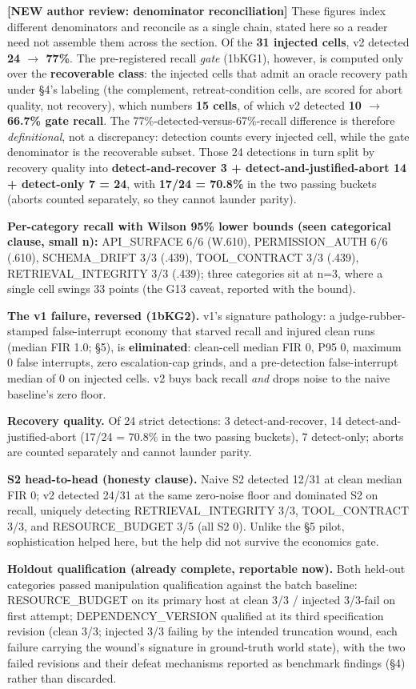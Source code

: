 \documentclass[acmsmall,screen,review,anonymous]{acmart}
\renewenvironment{leftbar}{%
  \def\FrameCommand{\hspace{2pt}{\color{lbcol}\vrule width 1.5pt}\hspace{8pt}}%
  \MakeFramed{\advance\hsize-\width \FrameRestore}\small}%
  {\endMakeFramed}
\begin{document}
\begin{leftbar}
\textbf{[NEW \textperiodcentered{} author review: denominator reconciliation]} These figures index different denominators and reconcile as a single chain, stated here so a reader need not assemble them across the section. Of the \textbf{31 injected cells}, v2 detected \textbf{24 $\rightarrow$ 77\%}. The pre-registered recall \emph{gate} (1bKG1), however, is computed only over the \textbf{recoverable class}: the injected cells that admit an oracle recovery path under \S4's labeling (the complement, retreat-condition cells, are scored for abort quality, not recovery), which numbers \textbf{15 cells}, of which v2 detected \textbf{10 $\rightarrow$ 66.7\% gate recall}. The 77\%-detected-versus-67\%-recall difference is therefore \emph{definitional}, not a discrepancy: detection counts every injected cell, while the gate denominator is the recoverable subset. Those 24 detections in turn split by recovery quality into \textbf{detect-and-recover 3 + detect-and-justified-abort 14 + detect-only 7 = 24}, with \textbf{17/24 = 70.8\%} in the two passing buckets (aborts counted separately, so they cannot launder parity).

\textbf{Per-category recall with Wilson 95\% lower bounds (seen categorical clause, small n):} API\_SURFACE 6/6 (W.610), PERMISSION\_AUTH 6/6 (.610), SCHEMA\_DRIFT 3/3 (.439), TOOL\_CONTRACT 3/3 (.439), RETRIEVAL\_INTEGRITY 3/3 (.439); three categories sit at n=3, where a single cell swings 33 points (the G13 caveat, reported with the bound).

\textbf{The v1 failure, reversed (1bKG2).} v1's signature pathology: a judge-rubber-stamped false-interrupt economy that starved recall and injured clean runs (median FIR 1.0; \S5), is \textbf{eliminated}: clean-cell median FIR 0, P95 0, maximum 0 false interrupts, zero escalation-cap grinds, and a pre-detection false-interrupt median of 0 on injected cells. v2 buys back recall \emph{and} drops noise to the naive baseline's zero floor.

\textbf{Recovery quality.} Of 24 strict detections: 3 detect-and-recover, 14 detect-and-justified-abort (17/24 = 70.8\% in the two passing buckets), 7 detect-only; aborts are counted separately and cannot launder parity.

\textbf{S2 head-to-head (honesty clause).} Naive S2 detected 12/31 at clean median FIR 0; v2 detected 24/31 at the same zero-noise floor and dominated S2 on recall, uniquely detecting RETRIEVAL\_INTEGRITY 3/3, TOOL\_CONTRACT 3/3, and RESOURCE\_BUDGET 3/5 (all S2 0). Unlike the \S5 pilot, sophistication helped here, but the help did not survive the economics gate.

\end{leftbar}
\textbf{Holdout qualification (already complete, reportable now).} Both held-out categories passed manipulation qualification against the batch baseline: RESOURCE\_BUDGET on its primary host at clean 3/3 / injected 3/3-fail on first attempt; DEPENDENCY\_VERSION qualified at its third specification revision (clean 3/3; injected 3/3 failing by the intended truncation wound, each failure carrying the wound's signature in ground-truth world state), with the two failed revisions and their defeat mechanisms reported as benchmark findings (\S4) rather than discarded.
\end{document}
